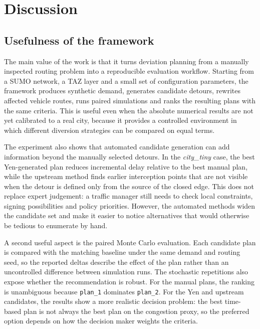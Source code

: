 \section{Discussion}

\subsection{Usefulness of the framework}

The main value of the work is that it turns deviation planning from a
manually inspected routing problem into a reproducible evaluation workflow.
Starting from a SUMO network, a TAZ layer and a small set of configuration
parameters, the framework produces synthetic demand, generates candidate
detours, rewrites affected vehicle routes, runs paired simulations and ranks
the resulting plans with the same criteria. This is useful even when the
absolute numerical results are not yet calibrated to a real city, because it
provides a controlled environment in which different diversion strategies can
be compared on equal terms.

The experiment also shows that automated candidate generation can add
information beyond the manually selected detours. In the \emph{city\_tiny}
case, the best Yen-generated plan reduces incremental delay relative to the
best manual plan, while the upstream method finds earlier interception points
that are not visible when the detour is defined only from the source of the
closed edge. This does not replace expert judgement: a traffic manager still
needs to check local constraints, signing possibilities and policy priorities.
However, the automated methods widen the candidate set and make it easier to
notice alternatives that would otherwise be tedious to enumerate by hand.

A second useful aspect is the paired Monte Carlo evaluation. Each candidate
plan is compared with the matching baseline under the same demand and routing
seed, so the reported deltas describe the effect of the plan rather than an
uncontrolled difference between simulation runs. The stochastic repetitions
also expose whether the recommendation is robust. For the manual plans, the
ranking is unambiguous because \texttt{plan\_1} dominates
\texttt{plan\_2}. For the Yen and upstream candidates, the results show a
more realistic decision problem: the best time-based plan is not always the
best plan on the congestion proxy, so the preferred option depends on how the
decision maker weights the criteria.

